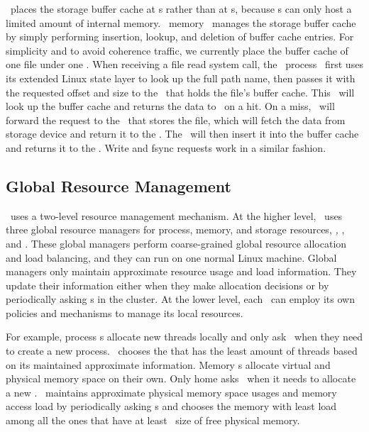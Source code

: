 \lego\ places the storage buffer cache at \mcomponent{}s
rather than at \scomponent{}s, because \scomponent{}s can only host a limited amount of internal memory.
\lego\ memory \microos\ manages the storage buffer cache by simply performing insertion, lookup, and deletion of buffer cache entries.
For simplicity and to avoid coherence traffic, we currently place the buffer cache of one file
under one \mcomponent{}.
When receiving a file read system call, the \lego\ process \microos\ first uses its extended Linux state layer to 
look up the full path name, then passes it with the requested offset and size to the \mcomponent\ that holds the file's buffer cache.
This \mcomponent\ will look up the buffer cache and returns the data to \pcomponent\ on a hit.
On a miss, \mcomponent\ will forward the request to the \scomponent\ that stores the file, 
which will fetch the data from storage device and return it to the \mcomponent.
The \mcomponent\ will then insert it into the buffer cache and returns it to the \pcomponent.
Write and fsync requests work in a similar fashion.

\subsection{Global Resource Management}
\label{sec:lego:grm}
\lego\ uses a two-level resource management mechanism.
At the higher level, \lego\ uses three global resource managers for process, memory, and storage resources, 
{\em \gpm, \gmm}, and {\em \gsm}.
These global managers perform coarse-grained global resource allocation and load balancing,
and they can run on one normal Linux machine.
Global managers only maintain approximate resource usage and load information.
They update their information either when they make allocation decisions 
or by periodically asking \microos{}s in the cluster.
At the lower level, each \microos\ can employ its own policies and mechanisms to manage its local resources.

For example, process \microos{}s allocate new threads locally 
and only ask \gpm\ when they need to create a new process.
\gpm\ chooses the \pcomponent{} that has the least amount of threads based on its maintained approximate information.
Memory \microos{}s allocate virtual and physical memory space on their own.
Only home \mcomponent{} asks \gmm\ when it needs to allocate a new \vregion.
\gmm\ maintains approximate physical memory space usages and memory access load by periodically asking \mcomponent{}s
and chooses the memory with least load among all the ones that have at least \vregion\ size of free physical memory.

